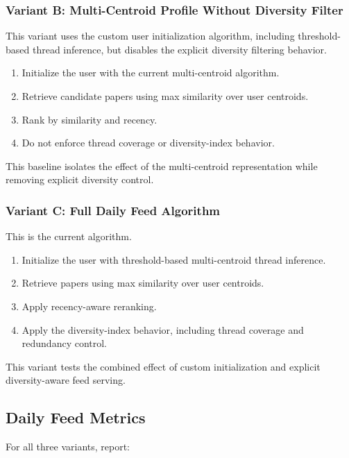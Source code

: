 \documentclass[11pt]{article}
\begin{document}
\subsubsection*{Variant B: Multi-Centroid Profile Without Diversity Filter}

This variant uses the custom user initialization algorithm, including threshold-based thread inference, but disables the explicit diversity filtering behavior.

\begin{enumerate}[leftmargin=*]
    \item Initialize the user with the current multi-centroid algorithm.
    \item Retrieve candidate papers using max similarity over user centroids.
    \item Rank by similarity and recency.
    \item Do not enforce thread coverage or diversity-index behavior.
\end{enumerate}

This baseline isolates the effect of the multi-centroid representation while removing explicit diversity control.

\subsubsection*{Variant C: Full Daily Feed Algorithm}

This is the current algorithm.

\begin{enumerate}[leftmargin=*]
    \item Initialize the user with threshold-based multi-centroid thread inference.
    \item Retrieve papers using max similarity over user centroids.
    \item Apply recency-aware reranking.
    \item Apply the diversity-index behavior, including thread coverage and redundancy control.
\end{enumerate}

This variant tests the combined effect of custom initialization and explicit diversity-aware feed serving.

\subsection{Daily Feed Metrics}

For all three variants, report:
\end{document}

